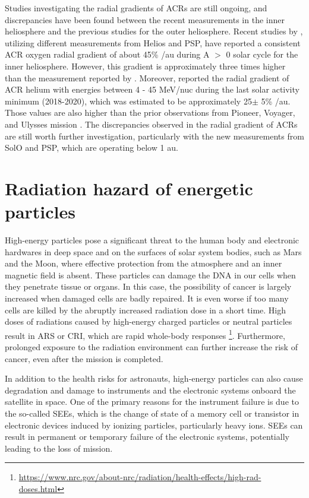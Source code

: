 Studies investigating the radial gradients of \acp{ACR} are still ongoing, and discrepancies have been found between the recent measurements in the inner heliosphere and the previous studies \citep{Webber1981JGR, Marsden1999AdSpR} for the outer heliosphere. Recent studies by \citet{Rankin2021ApJ, Rankin2022ApJ, Marquardt2018AA}, utilizing different measurements from Helios and \ac{PSP}, have reported a consistent ACR oxygen radial gradient of about 45\% /au during A $>$ 0 solar cycle for the inner heliosphere. However, this gradient is approximately three times higher than the measurement reported by \citet{Webber1981JGR}. Moreover, \citet{Rankin2022ApJ} reported the radial gradient of ACR helium with energies between 4 - 45 MeV/nuc during the last solar activity minimum (2018-2020), which was estimated to be approximately 25$\pm$ 5\% /au. Those values are also higher than the prior observations from Pioneer, Voyager, and Ulysses mission \citep{McDonald2001ICRC, Webber1981JGR, McKibben1989JGR, McDonald1986GeoRL, Cummings1987GeoRL, Cummings1995GeoRL}. The discrepancies observed in the radial gradient of \acp{ACR} are still worth further investigation, particularly with the new measurements from \ac{SolO} and \ac{PSP}, which are operating below 1 au.


\section{Radiation hazard of energetic particles}


High-energy particles pose a significant threat to the human body and electronic hardwares in deep space and on the surfaces of solar system bodies, such as Mars and the Moon, where effective protection from the atmosphere and an inner magnetic field is absent.
These particles can damage the \ac{DNA} in our cells when they penetrate tissue or organs. In this case, the possibility of cancer is largely increased when damaged cells are badly repaired. It is even worse if too many cells are killed by the abruptly increased radiation dose in a short time.
High doses of radiations caused by high-energy charged particles or neutral particles result in \ac{ARS} or \ac{CRI}, which are rapid whole-body responses \footnote{\url{https://www.nrc.gov/about-nrc/radiation/health-effects/high-rad-doses.html}}. Furthermore, prolonged exposure to the radiation environment can further increase the risk of cancer, even after the mission is completed.

In addition to the health risks for astronauts, high-energy particles can also cause degradation and damage to instruments and the electronic systems onboard the satellite in space. One of the primary reasons for the instrument failure is due to the so-called \acp{SEE}, which is the change of state of a memory cell or transistor in electronic devices induced by ionizing particles, particularly heavy ions. \acp{SEE} can result in permanent or temporary failure of the electronic systems, potentially leading to the loss of mission. 


